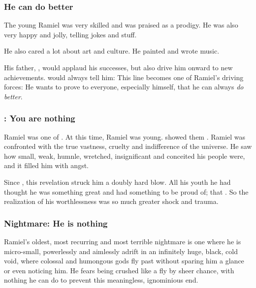 \subsubsection{He can do better}
The young Ramiel was very skilled and was praised as a prodigy. 
He was also very happy and jolly, telling jokes and stuff. 

He also cared a lot about art and culture. 
He painted and wrote music. 

His father, \Nathrach{}, would applaud his successes, but also drive him onward to new achievements. 
\Nathrach{} would always tell him: 
This line becomes one of Ramiel's driving forces: 
He wants to prove to everyone, especially himself, that he can always \emph{do better}. 





\subsubsection{\Semiza{}: You are nothing}
Ramiel was one of . 
At this time, Ramiel was young. 
\Semiza{} showed them . 
Ramiel was confronted with the true vastness, cruelty and indifference of the universe. 
He saw how small, weak, humnle, wretched, insignificant and conceited his people were, and it filled him with angst. 

Since , this revelation struck him a doubly hard blow. 
All his youth he had thought he was something great and had something to be proud of; that . 
So the realization of his worthlessness was so much greater shock and trauma. 




\subsubsection{Nightmare: He is nothing}
Ramiel's oldest, most recurring and most terrible nightmare is one where he is micro-small, powerlessly and aimlessly adrift in an infinitely huge, black, cold void, where colossal and humongous gods fly past without sparing him a glance or even noticing him. 
He fears being crushed like a fly by sheer chance, with nothing he can do to prevent this meaningless, ignominious end. 

